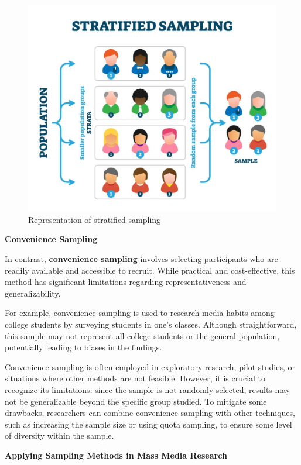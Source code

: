 \documentclass[
]{book}
\begin{document}
\begin{figure}
\centering
\includegraphics[width=1\linewidth,height=\textheight,keepaspectratio]{images/strata.jpg}
\caption{Representation of stratified sampling}
\end{figure}

\textbf{Convenience Sampling}

In contrast, \textbf{convenience sampling} involves selecting participants who are readily available and accessible to recruit. While practical and cost-effective, this method has significant limitations regarding representativeness and generalizability.

For example, convenience sampling is used to research media habits among college students by surveying students in one's classes. Although straightforward, this sample may not represent all college students or the general population, potentially leading to biases in the findings.

Convenience sampling is often employed in exploratory research, pilot studies, or situations where other methods are not feasible. However, it is crucial to recognize its limitations: since the sample is not randomly selected, results may not be generalizable beyond the specific group studied. To mitigate some drawbacks, researchers can combine convenience sampling with other techniques, such as increasing the sample size or using quota sampling, to ensure some level of diversity within the sample.

\textbf{Applying Sampling Methods in Mass Media Research}
\end{document}

